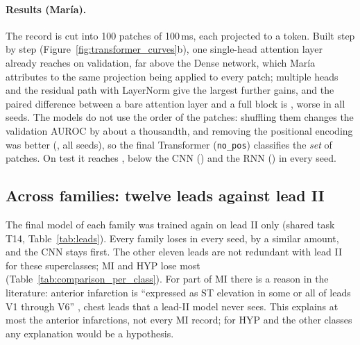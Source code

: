 \paragraph{Results (Mar\'ia).} The record is cut into 100 patches of 100\,ms, each projected to a
token. Built step by step (Figure~\ref{fig:transformer_curves}b), one single-head attention layer
already reaches \transformerValAurocMeanSaSingle{} on validation, far above the Dense network, which
Mar\'ia attributes to the same projection being applied to every patch; multiple heads and the residual path with LayerNorm
give the largest further gains, and the paired difference between a bare attention layer and a
full block is \transformerPairSaVsBlockMean{}, worse in all seeds. The models do not use the order
of the patches: shuffling them changes the validation AUROC by about a thousandth, and removing the
positional encoding was better (\transformerDiffMeanNoPos{}, all seeds), so the final Transformer
(\texttt{no\_pos}) classifies the \emph{set} of patches. On test it reaches
\transformerFinalTestMacroAurocMean{}, below the CNN (\transformerDiffCnnMean{}) and the RNN
(\transformerDiffRnnMean{}) in every seed.



\subsection{Across families: twelve leads against lead II}\label{sec:leads}

The final model of each family was trained again on lead II only (shared task T14,
Table~\ref{tab:leads}). Every family loses in every seed, by a similar amount, and the CNN stays first.
The other eleven leads are not redundant with lead II for these superclasses; MI and HYP lose most
(Table~\ref{tab:comparison_per_class}). For part of MI there is a reason in the literature: anterior
infarction is ``expressed as ST elevation in some or all of leads V1 through V6''
\cite[p.~e265]{wagner2009aha}, chest leads that a lead-II model never sees. This explains at most the
anterior infarctions, not every MI record; for HYP and the other classes any explanation would be a
hypothesis.




